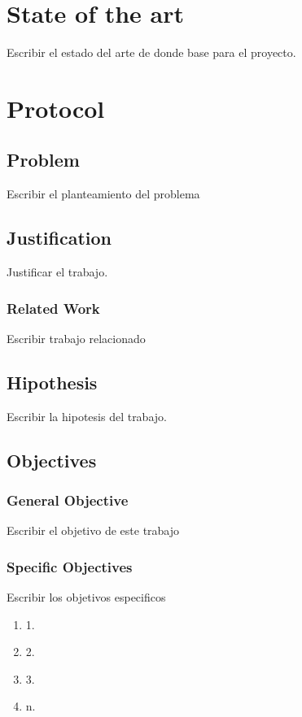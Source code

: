 \section{State of the art}

Escribir el estado del arte de donde base para el proyecto. 

\section{Protocol}

\subsection{Problem}

Escribir el planteamiento del problema


\subsection{Justification}

Justificar el trabajo. 

\subsubsection{Related Work} 

Escribir trabajo relacionado
	
\subsection{Hipothesis}

Escribir la hipotesis del trabajo.

\subsection{Objectives}
\subsubsection{General Objective}

Escribir el objetivo de este trabajo

\subsubsection{Specific Objectives}

Escribir los objetivos especificos
\begin{enumerate}
\item 1.
\item 2.
\item 3. 
\item n.
  

\end{enumerate}

